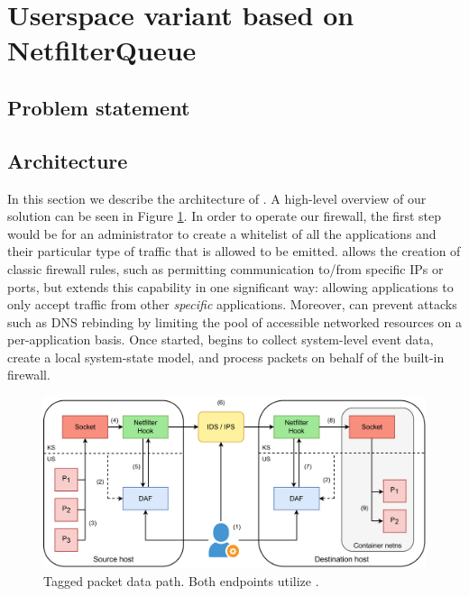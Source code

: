 \section{Userspace variant based on NetfilterQueue}
\label{appfw:daf}

\subsection{Problem statement}
\label{appfw:daf:intro}


\subsection{Architecture}
\label{apffw:daf:architecture}

In this section we describe the architecture of \daf{}. A high-level overview of our solution can be seen in Figure \ref{appfw:daf:fig:sys-architecture}. In order to operate our firewall, the first step would be for an administrator to create a whitelist of all the applications and their particular type of traffic that is allowed to be emitted. \daf{} allows the creation of classic firewall rules, such as permitting communication to/from specific IPs or ports, but extends this capability in one significant way: allowing applications to only accept traffic from other \textit{specific} applications. Moreover, \daf{} can prevent attacks such as DNS rebinding by limiting the pool of accessible networked resources on a per-application basis. Once started, \daf{} begins to collect system-level event data, create a local system-state model, and process packets on behalf of the built-in firewall.

\begin{figure}
    \centering
    \includegraphics[width=\textwidth,keepaspectratio]{figures/daf-sys-architecture.pdf}
    \caption{Tagged packet data path. Both endpoints utilize \daf{}.}
    \label{appfw:daf:fig:sys-architecture}
\end{figure}

